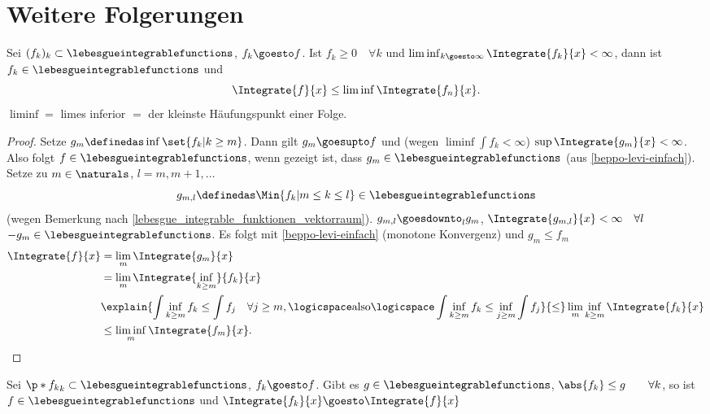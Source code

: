 \section{Weitere Folgerungen}
\begin{satz}[Fatou]\label{fatou}
  Sei \( (f_k)_k\subset \lebesgueintegrablefunctions \), \( f_k\goesto f \). Ist \( f_k\geq 0\quad \forall k \) und \( \liminf_{k \goesto \infty}\Integrate{f_k}{x}<\infty \), dann ist \( f_k\in \lebesgueintegrablefunctions \) und 
  \begin{equation*}
    \Integrate{f}{x}\leq \liminf \Integrate{f_n}{x}.
  \end{equation*}
  \( \liminf= \) limes inferior \( = \) der kleinste Häufungspunkt einer Folge.
\end{satz}
\begin{proof}
  Setze \( g_m\definedas \inf\set{f_k|k\geq m} \). Dann gilt \( g_m\goesupto f \) und (wegen \( \liminf \int f_k<\infty \)) \( \sup \Integrate{g_m}{x}<\infty \). Also folgt \( f\in \lebesgueintegrablefunctions \), wenn gezeigt ist, dass \( g_m\in \lebesgueintegrablefunctions \) (aus \ref{beppo-levi-einfach}). Setze zu \( m\in \naturals \), \( l=m,m+1,\dotsc \) 
  \begin{equation*}
    g_{m,l}\definedas \Min{f_k|m\leq k\leq l}\in \lebesgueintegrablefunctions
  \end{equation*}
  (wegen Bemerkung nach \ref{lebesgue_integrable_funktionen_vektorraum}). \( g_{m,l}\goesdownto_l g_m \), \( \Integrate{g_{m,l}}{x}<\infty \quad \forall l\) \timplies \( -g_m\in \lebesgueintegrablefunctions \). Es folgt mit \ref{beppo-levi-einfach} (monotone Konvergenz) und \( g_m\leq f_m \)
  \begin{align*}
    \Integrate{f}{x}&=\lim_m \Integrate{g_m}{x}\\
    &=\lim_m \Integrate{\inf_{k\geq m}}{f_k}{x}\\
    &\explain{\int{\inf_{k\geq m}{f_k}}\leq \int f_j\quad \forall j\geq m,\logicspace \text{also}\logicspace \int \inf_{k\geq m}{f_k}\leq \inf_{j\geq m}\int f_j}{\leq}\lim_m \inf_{k\geq m}\Integrate{f_k}{x}\\
    &\leq \liminf_m \Integrate{f_m}{x}.
  \end{align*}
\end{proof}
\begin{satz}\label{majorisierte_konvergenz}
  Sei \( \p*{f_k}_k\subset \lebesgueintegrablefunctions \), \( f_k\goesto f \). Gibt es \( g\in \lebesgueintegrablefunctions \), \sd \( \abs{f_k}\leq g \qquad \forall k  \), so ist \( f\in \lebesgueintegrablefunctions \) und \( \Integrate{f_k}{x}\goesto \Integrate{f}{x} \)
\end{satz}
